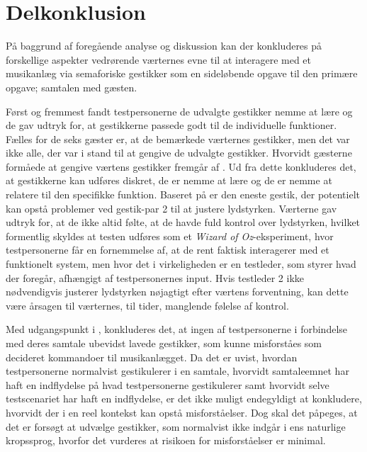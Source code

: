 \section{Delkonklusion}
\label{SocialAcceptDelkonklusion}
%
På baggrund af foregående analyse og diskussion kan der konkluderes på forskellige aspekter vedrørende værternes evne til at interagere med et musikanlæg via semaforiske gestikker som en sideløbende opgave til den primære opgave; samtalen med gæsten.

Først og fremmest fandt testpersonerne de udvalgte gestikker nemme at lære og de gav udtryk for, at gestikkerne passede godt til de individuelle funktioner. Fælles for de seks gæster er, at de bemærkede værternes gestikker, men det var ikke alle, der var i stand til at gengive de udvalgte gestikker. Hvorvidt gæsterne formåede at gengive værtens gestikker fremgår af . Ud fra dette konkluderes det, at gestikkerne kan udføres diskret, de er nemme at lære og de er nemme at relatere til den specifikke funktion. Baseret på  er den eneste gestik, der potentielt kan opstå problemer ved gestik-par 2 til at justere lydstyrken. Værterne gav udtryk for, at de ikke altid følte, at de havde fuld kontrol over lydstyrken, hvilket formentlig skyldes at testen udføres som et \textit{Wizard of Oz}-eksperiment, hvor testpersonerne får en fornemmelse af, at de rent faktisk interagerer med et funktionelt system, men hvor det i virkeligheden er en testleder, som styrer hvad der foregår, afhængigt af testpersonernes input. Hvis testleder 2 ikke nødvendigvis justerer lydstyrken nøjagtigt efter værtens forventning, kan dette være årsagen til værternes, til tider, manglende følelse af kontrol.    

Med udgangspunkt i , konkluderes det, at ingen af testpersonerne i forbindelse med deres samtale ubevidst lavede gestikker, som kunne misforståes som decideret kommandoer til musikanlægget. Da det er uvist, hvordan testpersonerne normalvist gestikulerer i en samtale, hvorvidt samtaleemnet har haft en indflydelse på hvad testpersonerne gestikulerer samt hvorvidt selve testscenariet har haft en indflydelse, er det ikke muligt endegyldigt at konkludere, hvorvidt der i en reel kontekst kan opstå misforståelser. Dog skal det påpeges, at det er forsøgt at udvælge gestikker, som normalvist ikke indgår i ens naturlige kropssprog, hvorfor det vurderes at risikoen for misforståelser er minimal.   

